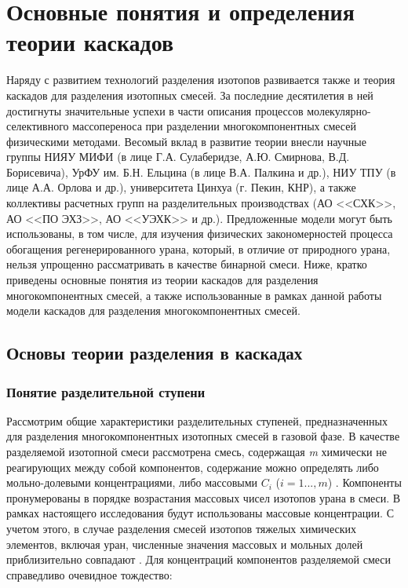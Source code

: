 \chapter{Основные понятия и определения теории каскадов}\label{ch2_theory}

Наряду с развитием технологий разделения изотопов развивается также и теория каскадов для разделения изотопных смесей. За последние десятилетия в ней достигнуты значительные успехи в части описания процессов молекулярно-селективного массопереноса при разделении многокомпонентных смесей физическими методами. Весомый вклад в развитие теории внесли научные группы НИЯУ МИФИ (в лице Г.А. Сулаберидзе, А.Ю. Смирнова, В.Д. Борисевича), УрФУ им. Б.Н. Ельцина (в лице В.А. Палкина и др.), НИУ ТПУ (в лице А.А. Орлова и др.), университета Цинхуа (г. Пекин, КНР), а также коллективы расчетных групп на разделительных производствах (АО <<СХК>>, АО <<ПО ЭХЗ>>, АО <<УЭХК>> и др.). Предложенные модели могут быть использованы, в том числе, для изучения физических закономерностей процесса обогащения регенерированного урана, который, в отличие от природного урана, нельзя упрощенно рассматривать в качестве бинарной смеси.
Ниже, кратко приведены основные понятия из теории каскадов для разделения многокомпонентных смесей, а также использованные в рамках данной работы модели каскадов для разделения многокомпонентных смесей.

\section{Основы теории разделения в каскадах}


\subsection{Понятие разделительной ступени}

Рассмотрим общие характеристики разделительных ступеней, предназначенных для разделения многокомпонентных изотопных смесей в газовой фазе. В качестве разделяемой изотопной смеси рассмотрена смесь, содержащая \textit{m} химически не реагирующих между собой компонентов, содержание можно определять либо мольно-долевыми концентрациями, либо массовыми $C_{i}$ ($i=1...,m$) \cite{sulaberidzeTeoriyaKaskadovDlya2011}. Компоненты пронумерованы в порядке возрастания массовых чисел изотопов урана в смеси. В рамках настоящего исследования будут использованы массовые концентрации. С учетом этого, в случае разделения смесей изотопов тяжелых химических элементов, включая уран, численные значения массовых и мольных долей приблизительно совпадают \cite{sulaberidzeTeoriyaKaskadovDlya2011}.  Для концентраций компонентов разделяемой смеси справедливо очевидное тождество:

